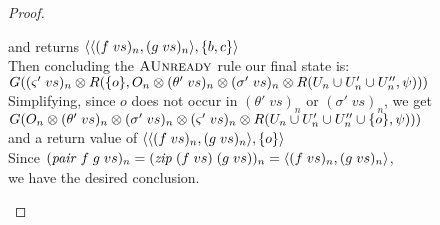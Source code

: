\begin{proof}
\begin{enumerate}
\begin{tabbedproof}
  \ooo and returns $\left<{\left<{(f\;vs)_n},{(g\;vs)_n}\right>},{\{{b,c}\}}\right>$ \\ 
  \ooo Then concluding the $\textsc{AUnready}$ rule our final state is: \\
  \ooo $G((\varsigma'\;vs)_n \otimes R(\{{o}\}, O_n \otimes (\theta'\;vs)_n \otimes (\sigma'\;vs)_n \otimes R(U_n \cup U'_n \cup U''_n, \psi)))$ \\ 
  \ooo Simplifying, since $o$ does not occur in $(\theta'\;vs)_n$ or $(\sigma'\;vs)_n$, we get \\
  \ooo $G(O_n \otimes (\theta'\;vs)_n \otimes (\sigma'\;vs)_n \otimes (\varsigma'\;vs)_n \otimes R(U_n \cup U'_n \cup U''_n \cup \{{o}\}, \psi)))$ \\ 
  \ooo and a return value of $\left<{\left<{(f\;vs)_n},{(g\;vs)_n}\right>},{\{{o}\}}\right>$ \\
  \ooo Since $(\mathit{pair}\;f\;g\;vs)_n = (\mathit{zip}\;(f\;vs)\;(g\;vs))_n = \left<{(f\;vs)_n},{(g\;vs)_n}\right>$, \\
  \ooo we have the desired conclusion. 
  \end{tabbedproof}
\end{enumerate}
\end{proof}

